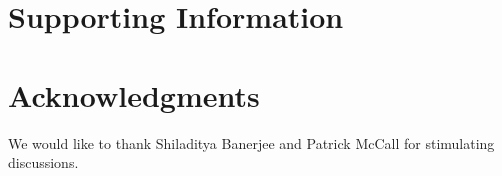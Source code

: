 \documentclass[10pt,letterpaper]{article}
\begin{document}
\section*{Supporting Information}


\section*{Acknowledgments}
We would like to thank Shiladitya Banerjee and Patrick McCall for stimulating discussions.

\nolinenumbers

%
%
% 

\end{document}
